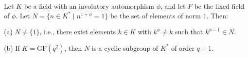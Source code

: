 Let $K$ be a field with an involutory automorphism $\phi$, and let $F$ be the fixed field of $\phi$. Let $N = \{n \in K^* \mid n^{1+\phi} = 1\}$ be the set of elements of norm $1$. Then:

(a) $N \neq \{1\}$, i.e., there exist elements $k \in K$ with $k^{\phi} \neq k$ such that $k^{\phi-1} \in N$.

(b) If $K = \text{GF}(q^2)$, then $N$ is a cyclic subgroup of $K^*$ of order $q+1$.
